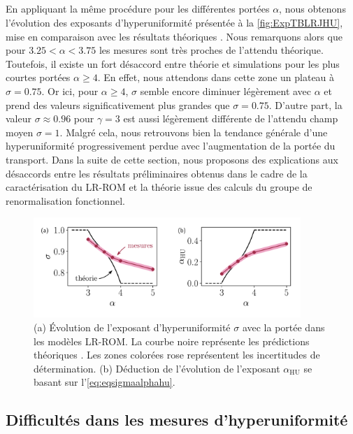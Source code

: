 \subparagraph{}En appliquant la même procédure pour les différentes portées $\alpha$, nous obtenons l'évolution des exposants d'hyperuniformité présentée à la \autoref{fig:ExpTBLRJHU}, mise en comparaison avec les résultats théoriques \cite{wiese_longrange}. Nous remarquons alors que pour $3.25 < \alpha < 3.75$ les mesures sont très proches de l'attendu théorique. Toutefois, il existe un fort désaccord entre théorie et simulations pour les plus courtes portées $\alpha \geq 4$. En effet, nous attendons dans cette zone un plateau à $\sigma = 0.75$. Or ici, pour $\alpha \geq 4$, $\sigma$ semble encore diminuer légèrement avec $\alpha$ et prend des valeurs significativement plus grandes que $\sigma = 0.75$. D'autre part, la valeur $\sigma \approx 0.96$ pour $\gamma = 3$ est aussi légèrement différente de l'attendu champ moyen $\sigma = 1$. Malgré cela, nous retrouvons bien la tendance générale d'une hyperuniformité progressivement perdue avec l'augmentation de la portée du transport. Dans la suite de cette section, nous proposons des explications aux désaccords entre les résultats préliminaires obtenus dans le cadre de la caractérisation du LR-ROM et la théorie issue des calculs du groupe de renormalisation fonctionnel.

\begin{figure}[h]
	\centering	\includegraphics[width=0.9\textwidth]{Chapitre2/Figures/Hyperuniformity/eta_alpha_jumps.pdf}
	\caption{(a) Évolution de l'exposant d'hyperuniformité $\sigma$ avec la portée dans les modèles LR-ROM. La courbe noire représente les prédictions théoriques \cite{wiese_hyperuniformity_2024, wiese_theory_2022, wiese_longrange}. Les zones colorées rose représentent les incertitudes de détermination. (b) Déduction de l'évolution de l'exposant $\alpha_\text{HU}$ se basant sur l'\autoref{eq:eqsigmaalphahu}.}
	\label{fig:ExpTBLRJHU}
\end{figure}

\subsection{Difficultés dans les mesures d'hyperuniformité}

